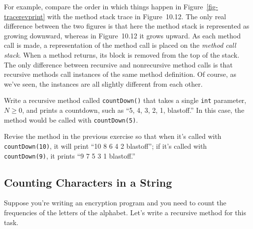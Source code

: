 
\noindent For example, compare the order in which things happen in
Figure~\ref{fig-tracerevprint} with the method stack trace in
Figure~10.12. The only real difference between the two
figures is that here the method stack is represented as growing
downward, whereas in Figure~10.12 it grows upward.
As each method call is made, a representation of the method call is
placed on the {\em method call stack}. 
When a method returns, its
block is removed from the top of the stack.  The only difference
between recursive and nonrecursive method calls is that recursive
methods call instances of the same method definition.   Of course, as
we've seen, the instances are all slightly different from each other.


\label{self-study-exercises}
\begin{SSTUDY}

\item  Write a recursive method called {\tt countDown()} that takes
a single {\tt int} parameter, $N \geq 0$, and prints a countdown,
such as ``5, 4, 3, 2, 1, blastoff.'' In this case, the
method would be called with {\tt countDown(5)}.


\item  Revise the method in the previous exercise so that when it's
called with {\tt countDown(10)}, it will print ``10 8 6 4 2 blastoff'';
if it's called with {\tt countDown(9)}, it prints ``9 7 5 3 1 blastoff.''

\end{SSTUDY}

\subsection{Counting Characters in a String}
\noindent Suppose you're writing an encryption program and you need to count the
frequencies of the letters of the alphabet.  Let's write a recursive
method for this task.

